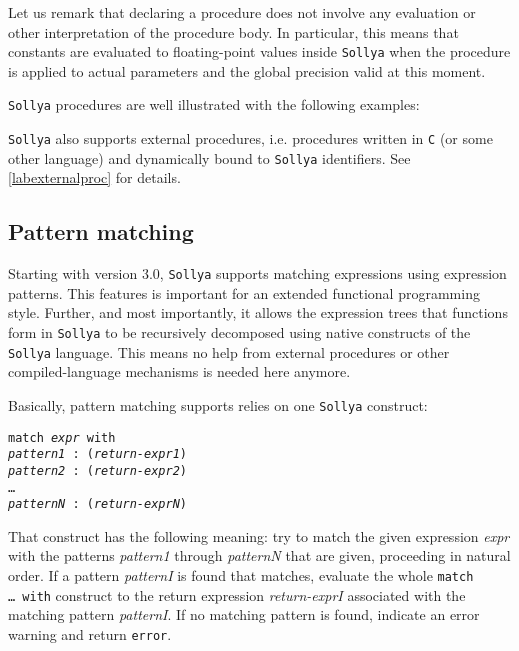 \documentclass[a4paper]{article}
\newcommand{\key}[1]{\texttt{#1}}
\newcommand{\sollya}{\texttt{Sollya}\xspace}
\begin{document}
Let us remark that declaring a procedure does not involve any evaluation or
other interpretation of the procedure body. In particular, this means
that constants are evaluated to floating-point values inside \sollya
when the procedure is applied to actual parameters and the global
precision valid at this moment.

\sollya procedures are well illustrated with the following examples:










\sollya also supports external procedures, i.e. procedures written in
\texttt{C} (or some other language) and dynamically bound to \sollya
identifiers. See \ref{labexternalproc} for details.

\subsection{Pattern matching}

Starting with version 3.0, \sollya supports matching expressions using
expression patterns. This features is important for an extended
functional programming style. Further, and most importantly, it allows
the expression trees that functions form in \sollya to be recursively
decomposed using native constructs of the \sollya language. This means
no help from external procedures or other compiled-language mechanisms
is needed here anymore.

Basically, pattern matching supports relies on one \sollya construct: 
\begin{center}
\begin{minipage}{0.8\textwidth}
\key{match {\it expr} with \\
{\it pattern1} : ({\it return-expr1}) \\
{\it pattern2} : ({\it return-expr2}) \\
\dots \\
{\it patternN} : ({\it return-exprN}) }
\end{minipage}
\end{center} 
That construct has the following meaning: try to match the given
expression {\it expr} with the patterns {\it pattern1} through {\it
  patternN} that are given, proceeding in natural order. If a pattern
{\it patternI} is found that matches, evaluate the whole \key{match
  \dots~with} construct to the return expression {\it return-exprI}
associated with the matching pattern {\it patternI}. If no matching
pattern is found, indicate an error warning and return \key{error}.
\end{document}
